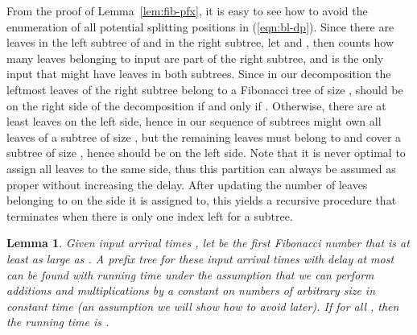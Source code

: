\documentclass[11pt,final,microtype]{scrartcl}
\theoremstyle{plain}
\newtheorem{lemma}[theorem]{Lemma}
\theoremstyle{definition}
\theoremstyle{remark}
\begin{document}
From the proof of Lemma~\ref{lem:fib-pfx}, it is easy to see how to
avoid the enumeration of all potential splitting positions
 in (\ref{eqn:bl-dp}). Since there are  leaves
in the left subtree of  and  in the right subtree, let  and , then  counts how many leaves belonging to input 
are part of the right subtree, and  is the only input that might
have leaves in both subtrees. Since in our decomposition the leftmost
 leaves of the right subtree belong to a Fibonacci tree of
size ,  should be on the right side of the decomposition
if and only if . Otherwise, there are at least
 leaves on the left side, hence in our sequence of subtrees
 might own all leaves of a subtree of size , but the
remaining leaves must belong to and cover a subtree of size
, hence  should be on the left side. Note that it is
never optimal to assign all leaves to the same side, thus this
partition can always be assumed as proper without increasing the
delay. After updating the number of leaves belonging to  on the
side it is assigned to, this yields a recursive procedure that
terminates when there is only one index left for a subtree.

\begin{lemma}\label{lem:fast-bl}
  Given input arrival times , let
   be the first Fibonacci number that is at least as large as
  . A prefix tree for these input
  arrival times with delay at most  can be found with running time
   under the
  assumption that we can perform additions and multiplications by a
  constant on numbers of arbitrary size in constant time (an
  assumption we will show how to avoid later). If  for all , then the running time is
  .
\end{lemma}
\end{document}
